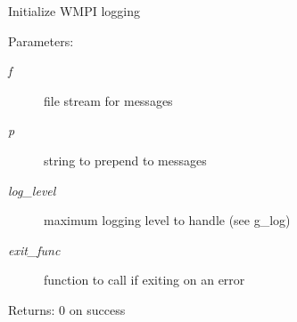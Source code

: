 Initialize WMPI logging

\begin{Desc}
\item[Parameters:]
\begin{description}
\item[{\em f}]file stream for messages \item[{\em p}]string to prepend to messages \item[{\em log\_\-level}]maximum logging level to handle (see g\_\-log) \item[{\em exit\_\-func}]function to call if exiting on an error\end{description}
\end{Desc}
\begin{Desc}
\item[Returns:]0 on success \end{Desc}
